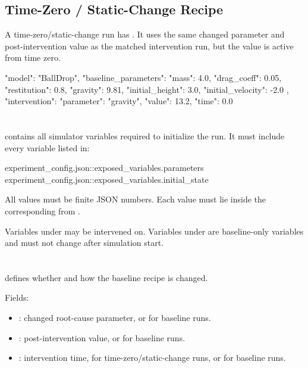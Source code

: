 \documentclass[11pt]{article}
\begin{document}
\subsection*{Time-Zero / Static-Change Recipe}\label{sec:candidate-generation-time0-baseline-recipe}

A time-zero/static-change run has .
It uses the same changed parameter and post-intervention value as the matched intervention run, but the value is active from time zero.

\begin{DocCode}
{
  "model": "BallDrop",
  "baseline_parameters": {
    "mass": 4.0,
    "drag_coeff": 0.05,
    "restitution": 0.8,
    "gravity": 9.81,
    "initial_height": 3.0,
    "initial_velocity": -2.0
  },
  "intervention": {
    "parameter": "gravity",
    "value": 13.2,
    "time": 0.0
  }
}
\end{DocCode}

\section*{\texorpdfstring{}{baseline\_parameters}}

 contains all simulator variables required to initialize the run.
It must include every variable listed in:

\begin{DocCode}
experiment_config.json::exposed_variables.parameters
experiment_config.json::exposed_variables.initial_state
\end{DocCode}

All values must be finite JSON numbers.
Each value must lie inside the corresponding  from .

Variables under  may be intervened on.
Variables under  are baseline-only variables and must not change after simulation start.

\section*{\texorpdfstring{}{intervention}}

 defines whether and how the baseline recipe is changed.

Fields:

\begin{itemize}
\item {}: changed root-cause parameter, or  for baseline runs.
\item {}: post-intervention value, or  for baseline runs.
\item {}: intervention time,  for time-zero/static-change runs, or  for baseline runs.
\end{itemize}
\end{document}
